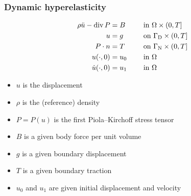 \begin{frame}
  \frametitle{Dynamic hyperelasticity}

  \begin{alignat*}{2}
    \rho \ddot{u} - \operatorname{\mathrm{div}} P &= B && \quad \text{ in } \Omega \times (0, T] \\
    u &= g && \quad \text{ on } \Gamma_{\mathrm{D}} \times (0, T] \\
    P \cdot n &= T && \quad \text{ on } \Gamma_{\mathrm{N}} \times (0, T] \\
    u(\cdot, 0) &= u_0 && \quad \text{ in } \Omega \\
    \dot{u}(\cdot, 0) &= u_1 && \quad \text{ in } \Omega
  \end{alignat*}

  \linespread{1.0}
  \begin{itemize}
  \item
    $u$ is the displacement
  \item
    $\rho$ is the (reference) density
  \item
    $P = P(u)$ is the first Piola--Kirchoff stress tensor
  \item
    $B$ is a given body force per unit volume
  \item
    $g$ is a given boundary displacement
  \item
    $T$ is a given boundary traction
  \item
    $u_0$ and $u_1$ are given initial displacement and velocity
  \end{itemize}
  \linespread{1.5}

\end{frame}
